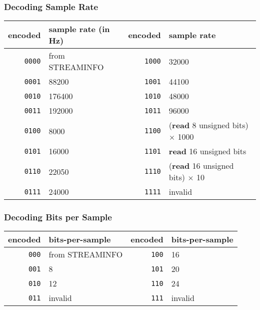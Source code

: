 \subsubsection{Decoding Sample Rate}
{
\begin{tabular}{rl||rl}
encoded & sample rate (in Hz) &
encoded & sample rate \\
\hline
\texttt{0000} & from STREAMINFO &
\texttt{1000} & 32000 \\
\texttt{0001} & 88200 &
\texttt{1001} & 44100 \\
\texttt{0010} & 176400 &
\texttt{1010} & 48000 \\
\texttt{0011} & 192000 &
\texttt{1011} & 96000 \\
\texttt{0100} & 8000 &
\texttt{1100} & (\textbf{read} 8 unsigned bits) $\times$ 1000 \\
\texttt{0101} & 16000 &
\texttt{1101} & \textbf{read} 16 unsigned bits \\
\texttt{0110} & 22050 &
\texttt{1110} & (\textbf{read} 16 unsigned bits) $\times$ 10 \\
\texttt{0111} & 24000 &
\texttt{1111} & invalid \\
\end{tabular}
}

\subsubsection{Decoding Bits per Sample}
{
\begin{tabular}{rl||rl}
encoded & bits-per-sample &
encoded & bits-per-sample \\
\hline
\texttt{000} & from STREAMINFO &
\texttt{100} & 16 \\
\texttt{001} & 8 &
\texttt{101} & 20 \\
\texttt{010} & 12 &
\texttt{110} & 24 \\
\texttt{011} & invalid &
\texttt{111} & invalid \\
\end{tabular}
}

